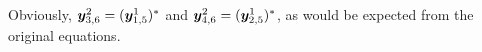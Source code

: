  Obviously, $\boldsymbol{y}^{2}_{3,6} = (\boldsymbol{y}^{1}_{1,5})^{*}$ and $\boldsymbol{y}^{2}_{4,6} = (\boldsymbol{y}^{1}_{2,5})^{*}$, as would be expected from the original equations. 
 


%
%
